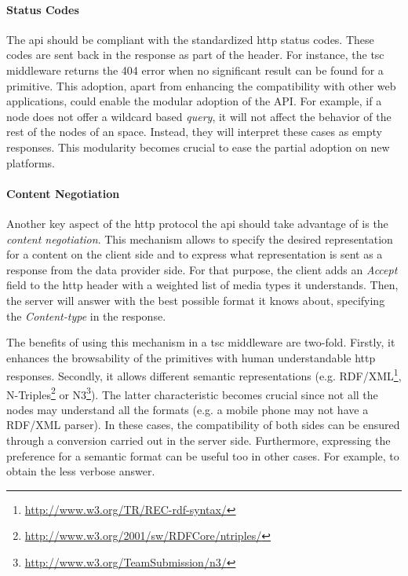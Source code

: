 \paragraph{Status Codes}
The \acs{api} should be compliant with the standardized \acs{http} status codes.
These codes are sent back in the response as part of the header.
For instance, the \ac{tsc} middleware returns the 404 error when no significant result can be found for a primitive.
This adoption, apart from enhancing the compatibility with other web applications, could enable the modular adoption of the API.
For example, if a node does not offer a wildcard based \textit{query}, it will not affect the behavior of the rest of the nodes of an space.
Instead, they will interpret these cases as empty responses.
This modularity becomes crucial to ease the partial adoption on new platforms.

\paragraph{Content Negotiation}
Another key aspect of the \acs{http} protocol the \acs{api} should take advantage of is the \textit{content negotiation}.
This mechanism allows to specify the desired representation for a content on the client side and to express what representation is sent as a response from the data provider side.
For that purpose, the client adds an \textit{Accept} field to the \acs{http} header with a weighted list of media types it understands.
Then, the server will answer with the best possible format it knows about, specifying the \textit{Content-type} in the response.

The benefits of using this mechanism in a \ac{tsc} middleware are two-fold.
Firstly, it enhances the browsability of the primitives with human understandable \acs{http} responses.
Secondly, it allows different semantic representations (e.g. RDF/XML\footnote{\url{http://www.w3.org/TR/REC-rdf-syntax/}}, N-Triples\footnote{\url{http://www.w3.org/2001/sw/RDFCore/ntriples/}} or N3\footnote{\url{http://www.w3.org/TeamSubmission/n3/}}).
The latter characteristic becomes crucial since not all the nodes may understand all the formats (e.g. a mobile phone may not have a RDF/XML parser).
In these cases, the compatibility of both sides can be ensured through a conversion carried out in the server side.
Furthermore, expressing the preference for a semantic format can be useful too in other cases.
For example, to obtain the less verbose answer.